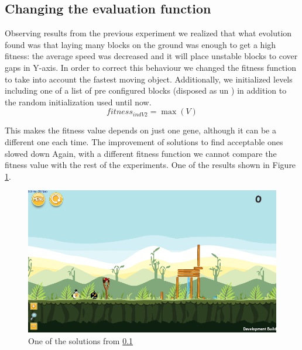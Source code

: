 \documentclass[sigconf]{acmart}
\begin{document}
\subsection{Changing the evaluation function}\label{E6}

Observing results from the previous experiment we realized that what
evolution found was that laying many blocks on the ground was enough
to get a high fitness: the average speed was decreased and it will
place unstable blocks to cover gaps in Y-axis. 
In order to correct this behaviour we changed the 
fitness function to take into account the fastest moving object. 
Additionally, we initialized levels including one of a list of pre configured
blocks (disposed as un \cite{ferreira2014search}) in addition to the random initialization used until now.
$$fitness_{indV2} = \max{(V)}$$

This makes the fitness value depends on just one gene, although it can be a
different one each time. The improvement of solutions to find acceptable ones
slowed down %
Again, with a different fitness function we cannot compare the fitness
value with the rest of the experiments. One of the results shown in 
Figure \ref{f:e6}.
 \begin{figure}
 	\centering
 	\includegraphics[scale=0.3]{E6.png}
 	\caption{One of the solutions from \ref{E6}}\label{f:e6}
 \end{figure}





%
\end{document}
